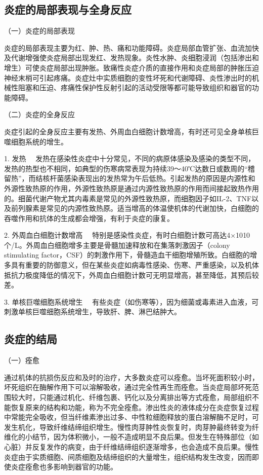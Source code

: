 \subsection{炎症的局部表现与全身反应}

{（一）炎症的局部表现}

炎症的局部表现主要为红、肿、热、痛和功能障碍。炎症局部血管扩张、血流加快及代谢增强使炎症局部出现发红、发热现象。炎性水肿、炎细胞浸润（包括渗出和增生）可使炎症局部出现肿胀。致痛性炎症介质的直接作用和炎症局部的肿胀压迫神经末梢可引起疼痛。炎症灶中实质细胞的变性坏死和代谢障碍、炎性渗出时的机械性阻塞和压迫、疼痛性保护性反射引起的活动受限等都可能导致组织和器官的功能障碍。

{（二）炎症的全身反应}

炎症引起的全身反应主要有发热、外周血白细胞计数增高，有时还可见全身单核巨噬细胞系统的增生。

{1. 发热}
　发热在感染性炎症中十分常见，不同的病原体感染及感染的类型不同，发热的热型也不相同，如典型的伤寒病常表现为持续39～40℃达数日或数周的“稽留热”，而结核杆菌感染表现出的发热常为午后低热。引起发热的原因是内源性和外源性致热原的作用，外源性致热原是通过内源性致热原的作用而间接起致热作用的。细菌代谢产物尤其内毒素是常见的外源性致热原，而细胞因子如IL-2、TNF以及前列腺素是常见的内源性致热原。适当增高的体温使机体的代谢加快，白细胞的吞噬作用和抗体的生成都会增强，有利于炎症的康复。

{2. 外周血白细胞计数增高}
　特别是感染性炎症，有时白细胞计数可高达4×10{10}
个/L。外周血白细胞增多主要是骨髓加速释放和在集落刺激因子（colony
stimulating
factor，CSF）的刺激作用下，骨髓造血干细胞增殖所致。白细胞的增多具有重要的防御意义，但在某些炎症如病毒性感染、伤寒、严重感染，以及机体抵抗力极度降低的情况下，外周血白细胞计数可无明显增高，甚至降低，其预后较差。

{3. 单核巨噬细胞系统增生}
　有些炎症（如伤寒等），因为细菌或毒素进入血液，可刺激单核巨噬细胞系统增生，导致肝、脾、淋巴结肿大。

\subsection{炎症的结局}

{（一）痊愈}

通过机体的抗损伤反应和及时的治疗，大多数炎症可以痊愈。当坏死面积较小时，坏死组织在酶解作用下可以溶解吸收，通过完全性再生而痊愈。当炎症局部坏死范围较大时，只能通过机化、纤维包裹、钙化以及分离排出等方式痊愈，局部组织不能恢复原来的结构和功能，称为不完全痊愈。渗出性炎的液体成分在炎症恢复过程中常能完全吸收，但当纤维素渗出过多、中性粒细胞释放的蛋白溶解酶不足时，可发生机化，导致纤维结缔组织增生。慢性肉芽肿性炎恢复时，肉芽肿最终转变为纤维化的小结节，因为体积微小，一般不造成明显不良后果。但发生在特殊部位（如心脏）并反复发作的病变，由于纤维结缔组织逐渐增多，也会造成不良后果。慢性炎症由于实质细胞、间质细胞及结缔组织的大量增生，组织结构发生改变，因而即使炎症痊愈也多影响到器官的功能。

